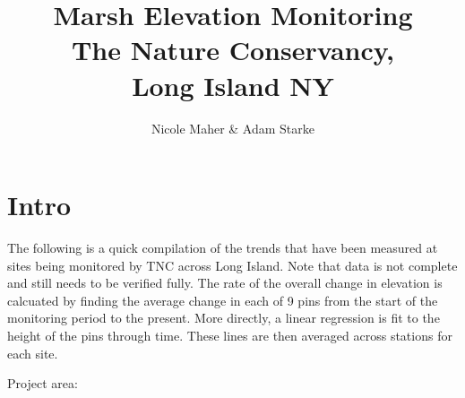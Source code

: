 \documentclass{article}\usepackage[]{graphicx}\usepackage[]{color}
\makeatletter
\newenvironment{kframe}{%
 \def\at@end@of@kframe{}%
 \ifinner\ifhmode%
  \def\at@end@of@kframe{\end{minipage}}%
  \begin{minipage}{\columnwidth}%
 \fi\fi%
 \def\FrameCommand##1{\hskip\@totalleftmargin \hskip-\fboxsep
 \colorbox{shadecolor}{##1}\hskip-\fboxsep
     \hskip-\linewidth \hskip-\@totalleftmargin \hskip\columnwidth}%
 \MakeFramed {\advance\hsize-\width
   \@totalleftmargin\z@ \linewidth\hsize
   \@setminipage}}%
 {\par\unskip\endMakeFramed%
 \at@end@of@kframe}
\makeatother
\begin{document}
\title{Marsh Elevation Monitoring\\
The Nature Conservancy, \\
Long Island NY}
\author{Nicole Maher \& Adam Starke}
\maketitle\thispagestyle{empty}





\section{Intro}
The following is a quick compilation of the trends that have been measured at sites being monitored by TNC across Long Island. Note that data is not complete and still needs to be verified fully. The rate of the overall change in elevation is calcuated by finding the average change in each of 9 pins from the start of the monitoring period to the present. More directly, a linear regression is fit to the height of the pins through time. These lines are then averaged across stations for each site. 

Project area:
\begin{kframe}


{\ttfamily\noindent\bfseries\color{errorcolor}{\#\# Error: cannot open URL 'http://b.tile.cloudmade.com/c669db620b804a3a90fbe4193c4c6ec8/125286@2x/256/10/301/383.png'}}

{\ttfamily\noindent\bfseries\color{errorcolor}{\#\# Error: object 'Site.blankmap' not found}}\end{kframe}
\end{document}
